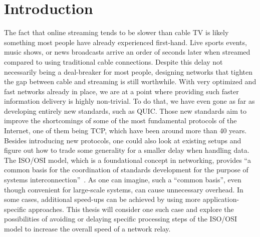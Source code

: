 
\chapter{Introduction}\label{chap:introduction}


The fact that online streaming tends to be slower than cable TV is likely something most people have already 
experienced first-hand.
Live sports events, music shows, or news broadcasts arrive an order of seconds later when streamed compared
to using traditional cable connections. %
Despite this delay not necessarily being a deal-breaker for most people, designing networks that 
tighten the gap between cable and streaming is still worthwhile.
With very optimized and fast networks already in place, we are at a point where providing such faster information
delivery is highly non-trivial.
To do that, we have even gone as far as developing entirely new standards, such as QUIC\@. 
Those new standards aim to improve the shortcomings of some of the most fundamental protocols of the Internet, one of them being TCP, which have been around more than 40 years. 
\\
Besides introducing new protocols, one could also look at existing setups and figure out how to trade some generality
for a smaller delay when handling data.
The ISO/OSI model, which is a foundational concept in networking, provides ``a common basis for the coordination 
of standards development for the purpose of systems interconnection''~\parencite{iso-osi-standard}.
As one can imagine, such a ``common basis'', even though convenient for large-scale systems, can cause unnecessary
overhead.
In some cases, additional speed-ups can be achieved by using more application-specific approaches.
This thesis will consider one such case and explore the possibilities of avoiding or delaying specific processing
steps of the ISO/OSI model to increase the overall speed of a network relay.






